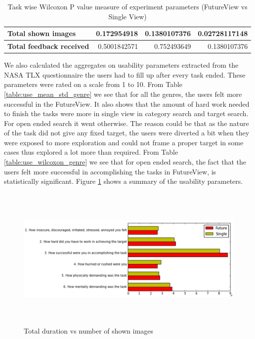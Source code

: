 \documentclass[english]{tktltiki}
\begin{document}
\begin{table}
\begin{center}
\begin{tabular}{|l|r|r|r|}
        \multicolumn{1}{|l|}{\textbf{Total shown images}} & 0.172954918 & 0.1380107376 & 0.02728117148 \\
        \hline
        
        \multicolumn{1}{|l|}{\textbf{Total feedback received}} & 0.5001842571 & 0.752493649 & 0.1380107376 \\
        \hline
        
    \end{tabular}
	\end{center}
	\caption{Task wise Wilcoxon P value measure of experiment parameters (FutureView vs Single View)}
    \label{table:exp_wilcox_task}
\end{table}

We also calculated the aggregates on usability parameters extracted from the NASA  TLX questionnaire the users had to fill up after every task ended. These parameters were rated on a scale from 1 to 10. From Table \ref{table:use_mean_std_genre} we see that for all the genres, the users felt more successful in the FutureView. It also shows that the amount of hard work needed to finish the tasks were more in single view in category search and target search. For open ended search it went otherwise. The reason could be that as the nature of the task did not give any fixed target, the users were diverted a bit when they were exposed to more exploration and could not frame a proper target in some cases thus explored a lot more than required. From Table \ref{table:use_wilcoxon_genre} we see that for open ended search, the fact that the users felt more successful in accomplishing the tasks in FutureView, is statistically significant. Figure \ref{fig:bar_chart_NASA_TLX} shows a summary of the usability parameters.


\begin{figure}[h!]
  \centering
    \includegraphics[width=1.0\textwidth,height=7cm]{figures/Bar_chart_usability_parameters_numbered.png}
    \caption{Total duration vs number of shown images}
    \label{fig:bar_chart_NASA_TLX}
\end{figure}
\end{document}
